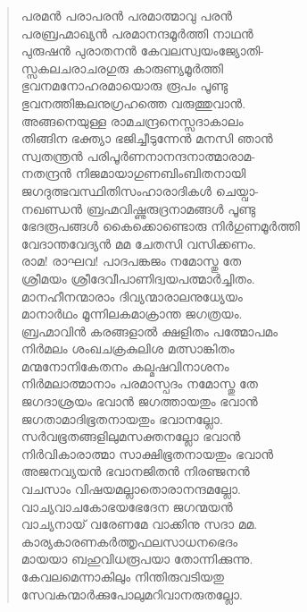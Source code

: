 \begin{verse}
പരമന്‍ പരാപരന്‍ പരമാത്മാവു പരന്‍\\
പരബ്രഹ്മാഖ്യന്‍ പരമാനന്ദമൂര്‍ത്തി നാഥന്‍\\
പുരുഷന്‍ പുരാതനന്‍ കേവലസ്വയംജ്യോതി-\\
സ്സകലചരാചരഗുരു കാരുണ്യമൂര്‍ത്തി\\
ഭുവനമനോഹരമായൊരു രൂപം പൂണ്ടു\\
ഭുവനത്തിങ്കലനുഗ്രഹത്തെ വരുത്തുവാന്‍.\\
അങ്ങനെയുള്ള രാമചന്ദ്രനെസ്സദാകാലം\\
തിങ്ങിന ഭക്ത്യാ ഭജിച്ചീടുന്നേന്‍ മനസി ഞാന്‍\\
സ്വതന്ത്രന്‍ പരിപൂര്‍ണനാനന്ദനാത്മാരാമ-\\
നതന്ദ്രന്‍ നിജമായാഗുണബിംബിതനായി\\
ജഗദുത്ഭവസ്ഥിതിസംഹാരാദികള്‍ ചെയ്വാ-\\
നഖണ്ഡന്‍ ബ്രഹ്മവിഷ്ണുരുദ്രനാമങ്ങള്‍ പൂണ്ടു\\
ഭേദരൂപങ്ങള്‍ കൈക്കൊണ്ടൊരു നിര്‍ഗുണമൂര്‍ത്തി\\
വേദാന്തവേദ്യന്‍ മമ ചേതസി വസിക്കണം.\\
രാമ! രാഘവ! പാദപങ്കജം നമോസ്തു തേ\\
ശ്രീമയം ശ്രീദേവീപാണിദ്വയപത്മാര്‍ച്ചിതം.\\
മാനഹീനന്മാരാം ദിവ്യന്മാരാലനുധ്യേയം\\
മാനാര്‍ഥം മൂന്നിലകമാക്രാന്ത ജഗത്രയം.\\
ബ്രഹ്മാവിന്‍ കരങ്ങളാല്‍ ക്ഷളിതം പത്മോപമം\\
നിര്‍മലം ശംഖചക്രകുലിശ മത്സാങ്കിതം\\
മന്മനോനികേതനം കല്മഷവിനാശനം\\
നിര്‍മലാത്മാനാം പരമാസ്പദം നമോസ്തു തേ\\
ജഗദാശ്രയം ഭവാന്‍ ജഗത്തായതും ഭവാന്‍\\
ജഗതാമാദിഭൂതനായതും ഭവാനല്ലോ.\\
സര്‍വഭൂതങ്ങളിലുമസക്തനല്ലോ ഭവാന്‍\\
നിര്‍വികാരാത്മാ സാക്ഷിഭൂതനായതും ഭവാന്‍\\
അജനവ്യയന്‍ ഭവാനജിതന്‍ നിരഞ്ജനന്‍\\
വചസാം വിഷയമല്ലാതൊരാനന്ദമല്ലോ.\\
വാച്യവാചകോഭയഭേദേന ജഗന്മയന്‍\\
വാച്യനായ് വരേണമേ വാക്കിനു സദാ മമ.\\
കാര്യകാരണകര്‍ത്തൃഫലസാധനഭെദം\\
മായയാ ബഹുവിധരൂപയാ തോന്നിക്കുന്നു.\\
കേവലമെന്നാകിലും നിന്തിരുവടിയതു\\
സേവകന്മാര്‍ക്കുപോലുമറിവാനരുതല്ലോ.\\

\end{verse}
